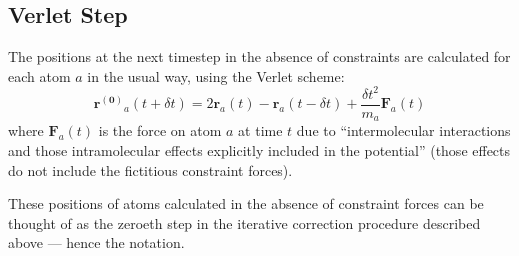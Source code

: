 \subsection{Verlet Step}
\label{sec:shake-verlet-step}
\par The positions at the next timestep in the absence of constraints are calculated for each atom $a$ in the usual way, using the  Verlet scheme:
\begin{equation}
\label{eq:shake-verlet}
\mathbf{r^{(0)}}_a(t + \delta t) = 2 \mathbf{r}_a(t) - \mathbf{r}_a(t - \delta t) + \frac{\delta t^2}{m_a} \mathbf{F}_a(t)
\end{equation}
where $\mathbf{F}_a(t)$ is the force on atom $a$ at time $t$ due to ``intermolecular interactions and those intramolecular effects explicitly included in the potential''\cite{allen} (those effects do not include the fictitious constraint forces).
\par These positions of atoms calculated in the absence of constraint forces can be thought of as the zeroeth step in the iterative correction procedure described above --- hence the notation.
